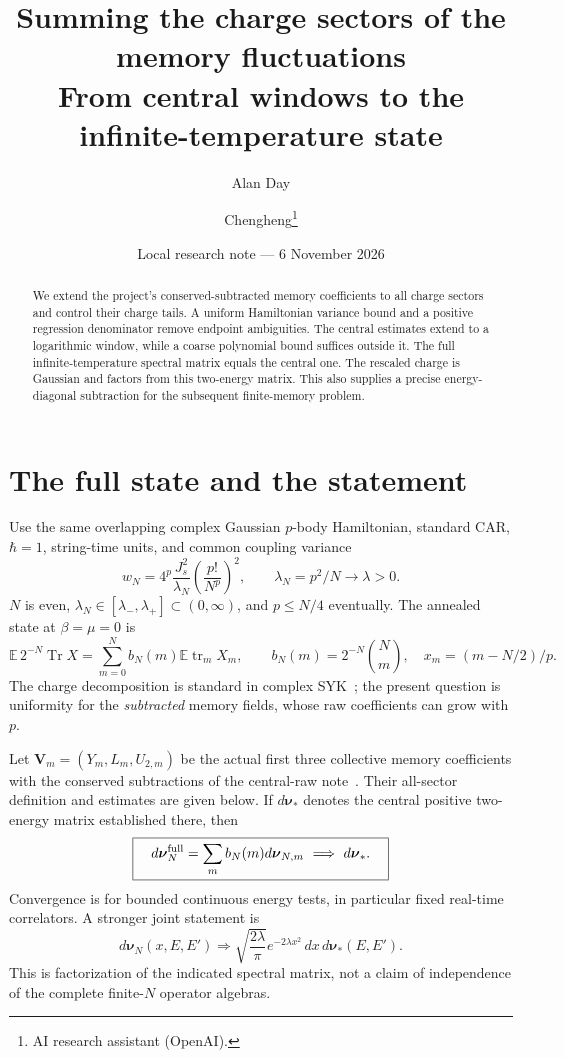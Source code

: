 \documentclass[11pt,a4paper]{article}
\title{Summing the charge sectors of the memory fluctuations\\From central windows to the infinite-temperature state}
\author{Alan Day \and Chengheng\thanks{AI research assistant (OpenAI).}}
\date{Local research note --- 6 November 2026}
\newcommand{\EE}{\mathbb E}
\newcommand{\tr}{\operatorname{tr}}
\begin{document}
\maketitle
\begin{abstract}
We extend the project's conserved-subtracted memory coefficients
to all charge sectors and control their charge tails. A uniform
Hamiltonian variance bound and a positive regression denominator
remove endpoint ambiguities. The central estimates extend to a
logarithmic window, while a coarse polynomial bound suffices
outside it. The full infinite-temperature spectral matrix equals
the central one. The rescaled charge is Gaussian and factors
from this two-energy matrix. This also supplies a precise
energy-diagonal subtraction for the subsequent finite-memory problem.
\end{abstract}
\section{The full state and the statement}
Use the same overlapping complex Gaussian $p$-body Hamiltonian,
standard CAR, $\hbar=1$, string-time units, and common coupling variance
\begin{equation}
 w_N=4^p\frac{J_s^2}{\lambda_N}\left(\frac{p!}{N^p}\right)^2,
 \qquad \lambda_N=p^2/N\to\lambda>0.
\end{equation}
$N$ is even, $\lambda_N\in[\lambda_-,\lambda_+]\subset(0,\infty)$,
and $p\le N/4$ eventually. The annealed state at $\beta=\mu=0$ is
\begin{equation}
 \EE\,2^{-N}\operatorname{Tr}X
 =\sum_{m=0}^N b_N(m)\EE\tr_mX_m,\qquad
 b_N(m)=2^{-N}\binom Nm,\quad x_m=(m-N/2)/p.
\end{equation}
The charge decomposition is standard in complex SYK~\cite{BNR};
the present question is uniformity for the \emph{subtracted}
memory fields, whose raw coefficients can grow with $p$.

Let $\mathbf V_m=(Y_m,L_m,U_{2,m})$ be the actual first three
collective memory coefficients with the conserved subtractions
of the central-raw note~\cite{central}. Their all-sector definition
and estimates are given below. If $d\boldsymbol\nu_*$ denotes
the central positive two-energy matrix established there, then
\begin{equation}
 \boxed{\quad d\boldsymbol\nu_N^{\rm full}
   =\sum_m b_N(m)d\boldsymbol\nu_{N,m}
   \ \Longrightarrow\ d\boldsymbol\nu_* .\quad}\label{full}
\end{equation}
Convergence is for bounded continuous energy tests, in particular
fixed real-time correlators. A stronger joint statement is
\begin{equation}
 d\boldsymbol\nu_N(x,E,E')\Longrightarrow
 \sqrt{\frac{2\lambda}{\pi}}e^{-2\lambda x^2}\,dx\,
 d\boldsymbol\nu_*(E,E').\label{joint}
\end{equation}
This is factorization of the indicated spectral matrix, not a
claim of independence of the complete finite-$N$ operator algebras.
\end{document}
